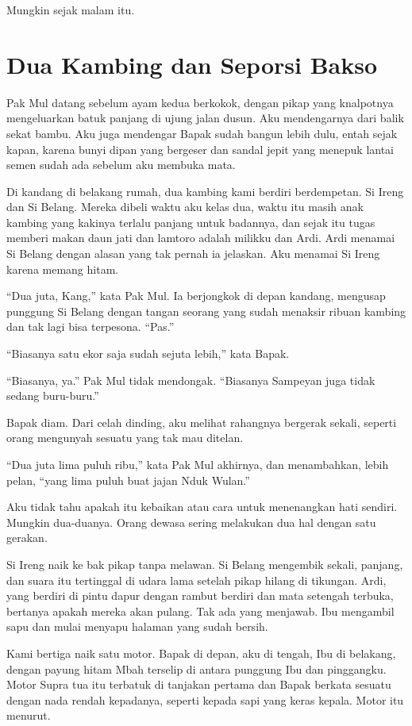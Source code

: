 \documentclass[11pt,twoside,openany]{book}
\makeatletter
\newcommand{\scenebreak}{\par\vspace{0.9em}{\centering\textsc{*\hspace{0.7em}*\hspace{0.7em}*}\par}\vspace{0.9em}\@afterindentfalse\@afterheading}
\makeatother
\begin{document}
Mungkin sejak malam itu.

\chapter{Dua Kambing dan Seporsi Bakso}
Pak Mul datang sebelum ayam kedua berkokok, dengan pikap yang knalpotnya mengeluarkan batuk panjang di ujung jalan dusun. Aku mendengarnya dari balik sekat bambu. Aku juga mendengar Bapak sudah bangun lebih dulu, entah sejak kapan, karena bunyi dipan yang bergeser dan sandal jepit yang menepuk lantai semen sudah ada sebelum aku membuka mata.

Di kandang di belakang rumah, dua kambing kami berdiri berdempetan. Si Ireng dan Si Belang. Mereka dibeli waktu aku kelas dua, waktu itu masih anak kambing yang kakinya terlalu panjang untuk badannya, dan sejak itu tugas memberi makan daun jati dan lamtoro adalah milikku dan Ardi. Ardi menamai Si Belang dengan alasan yang tak pernah ia jelaskan. Aku menamai Si Ireng karena memang hitam.

``Dua juta, Kang,'' kata Pak Mul. Ia berjongkok di depan kandang, mengusap punggung Si Belang dengan tangan seorang yang sudah menaksir ribuan kambing dan tak lagi bisa terpesona. ``Pas.''

``Biasanya satu ekor saja sudah sejuta lebih,'' kata Bapak.

``Biasanya, ya.'' Pak Mul tidak mendongak. ``Biasanya Sampeyan juga tidak sedang buru-buru.''

Bapak diam. Dari celah dinding, aku melihat rahangnya bergerak sekali, seperti orang mengunyah sesuatu yang tak mau ditelan.

``Dua juta lima puluh ribu,'' kata Pak Mul akhirnya, dan menambahkan, lebih pelan, ``yang lima puluh buat jajan Nduk Wulan.''

Aku tidak tahu apakah itu kebaikan atau cara untuk menenangkan hati sendiri. Mungkin dua-duanya. Orang dewasa sering melakukan dua hal dengan satu gerakan.

Si Ireng naik ke bak pikap tanpa melawan. Si Belang mengembik sekali, panjang, dan suara itu tertinggal di udara lama setelah pikap hilang di tikungan. Ardi, yang berdiri di pintu dapur dengan rambut berdiri dan mata setengah terbuka, bertanya apakah mereka akan pulang. Tak ada yang menjawab. Ibu mengambil sapu dan mulai menyapu halaman yang sudah bersih.

\scenebreak
Kami bertiga naik satu motor. Bapak di depan, aku di tengah, Ibu di belakang, dengan payung hitam Mbah terselip di antara punggung Ibu dan pinggangku. Motor Supra tua itu terbatuk di tanjakan pertama dan Bapak berkata sesuatu dengan nada rendah kepadanya, seperti kepada sapi yang keras kepala. Motor itu menurut.
\end{document}
